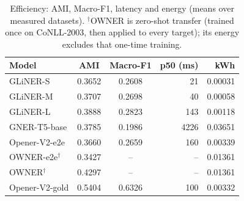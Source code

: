\begin{table}[t]
\centering
\caption{Efficiency: AMI, Macro-F1, latency and energy (means over measured datasets). $^\dagger$OWNER is zero-shot transfer (trained once on CoNLL-2003, then applied to every target); its energy excludes that one-time training.}
\label{tab:efficiency}
\begin{tabular}{lccrr}
\toprule
\textbf{Model} & \textbf{AMI} & \textbf{Macro-F1} & \textbf{p50 (ms)} & \textbf{kWh} \\
\midrule
GLiNER-S & 0.3652 & 0.2608 & 21 & 0.00031 \\
GLiNER-M & 0.3707 & 0.2698 & 40 & 0.00058 \\
GLiNER-L & 0.3888 & 0.2823 & 143 & 0.00118 \\
GNER-T5-base & 0.3785 & 0.1986 & 4226 & 0.03651 \\
Opener-V2-e2e & 0.3660 & 0.2659 & 160 & 0.00339 \\
OWNER-e2e$^\dagger$ & 0.3427 & -- & -- & 0.01361 \\
OWNER$^\dagger$ & 0.4297 & -- & -- & 0.01361 \\
Opener-V2-gold & 0.5404 & 0.6326 & 100 & 0.00332 \\
\bottomrule
\end{tabular}
\end{table}
